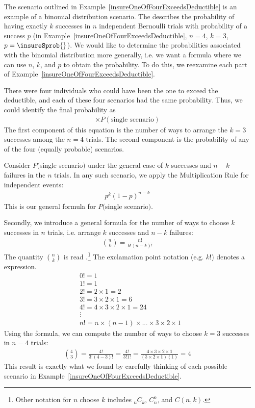 The scenario outlined in Example~\ref{insureOneOfFourExceedsDeductible} is an
example of a binomial distribution scenario.
The 
describes the probability of having exactly $k$ successes
in $n$ independent Bernoulli trials with probability
of a success $p$
(in Example~\ref{insureOneOfFourExceedsDeductible},
$n=4$, $k=3$, $p=\insureSprob{}$).
We would like to determine the probabilities associated
with the binomial distribution more generally,
i.e. we want a formula where we can use $n$, $k$, and $p$
to obtain the probability.
To do this, we reexamine each part of
Example~\ref{insureOneOfFourExceedsDeductible}.

There were four individuals who could have been the one
to exceed the deductible, and each of these four scenarios
had the same probability.
Thus, we could identify the final probability as
\begin{align*}
[\text{\# of scenarios}] \times P(\text{single scenario})
\end{align*}
The first component of this equation is the number of ways
to arrange the $k=3$ successes among the $n=4$ trials.
The second component is the probability of any of the four
(equally probable) scenarios.

\D{\newpage}

Consider $P($single scenario$)$ under the general case of
$k$ successes and $n-k$ failures in the $n$ trials.
In any such scenario, we apply the Multiplication Rule
for independent events:
\begin{align*}
p^k (1 - p)^{n - k}
\end{align*}
This is our general formula for $P($single scenario$)$.

Secondly, we introduce a general formula for the number
of ways to choose $k$ successes in $n$ trials,
i.e. arrange $k$ successes and $n - k$ failures:
\begin{align*}
{n\choose k} = \frac{n!}{k! (n - k)!}
\end{align*}
The quantity ${n\choose k}$ is read
.\footnote{Other notation for
  $n$ choose $k$ includes $_nC_k$, $C_n^k$, and $C(n,k)$.}
The exclamation point notation (e.g. $k!$) denotes
a  expression.\label{factorial_defined}
\begin{align*}
& 0! = 1 \\
& 1! = 1 \\
& 2! = 2\times1 = 2 \\
& 3! = 3\times2\times1 = 6 \\
& 4! = 4\times3\times2\times1 = 24 \\
& \vdots \\
& n! = n\times(n-1)\times...\times3\times2\times1
\end{align*}
Using the formula, we can compute the number of ways
to choose $k = 3$ successes in $n = 4$ trials:
\begin{align*}
{4 \choose 3} = \frac{4!}{3!(4-3)!}
  = \frac{4!}{3!1!} 
  = \frac{4\times3\times2\times1}{(3\times2\times1) (1)}
  = 4
\end{align*}
This result is exactly what we found by carefully thinking
of each possible scenario in
Example~\ref{insureOneOfFourExceedsDeductible}.

